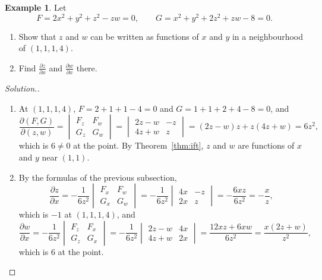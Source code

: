 \documentclass[11pt,a4paper]{article}
\theoremstyle{definition}
\newtheorem{exa}[thm]{Example}
\newenvironment{solution}
  {\renewcommand{\qedsymbol}{}\begin{proof}[\textit{Solution}.]}
  {\end{proof}}
\begin{document}
\begin{exa}
\label{ex:ift2}
Let
\[F = 2x^2 + y^2 + z^2 -zw = 0,\qquad G = x^2 + y^2 +2z^2 + zw- 8 = 0 .\]
\begin{enumerate}
\item Show that $z$ and $w$ can be written as functions of $x$ and $y$ in a
neighbourhood of $(1,1,1,4)$.

\item Find $\frac{\partial z}{\partial x}$ and $\frac{\partial w}{\partial x}$
there.
\end{enumerate}
\end{exa}

\begin{solution}
\begin{enumerate}
\item At $(1,1,1,4)$, $F = 2 + 1 + 1 - 4 = 0$ and $G = 1 + 1 + 2 + 4 - 8 = 0$, and
\[\frac{\partial (F,G)}{\partial (z,w)} = \begin{vmatrix}
F_z & F_w\\
G_z & G_w
\end{vmatrix}=\begin{vmatrix}
2z - w & -z\\
4z + w & z
\end{vmatrix} = (2z - w)z + z(4z + w) = 6z^2 ,\]
which is $6\neq 0$ at the point. By Theorem~\ref{thm:ift}, $z$ and $w$ are
functions of $x$ and $y$ near $(1,1)$.

\item By the formulas of the previous subsection,
\[\frac{\partial z}{\partial x} = -\frac{1}{6z^2}\begin{vmatrix}
F_x & F_w\\
G_x & G_w
\end{vmatrix} = -\frac{1}{6z^2}\begin{vmatrix}
4x & -z\\
2x & z
\end{vmatrix} = -\frac{6xz}{6z^2} = -\frac{x}{z},\]
which is $-1$ at $(1,1,1,4)$, and
\[\frac{\partial w}{\partial x} = -\frac{1}{6z^2}\begin{vmatrix}
F_z & F_x\\
G_z & G_x
\end{vmatrix} = -\frac{1}{6z^2}\begin{vmatrix}
2z-w & 4x\\
4z + w & 2x
\end{vmatrix} = \frac{12xz + 6xw}{6z^2} = \frac{x(2z + w)}{z^2},\]
which is $6$ at the point.
\end{enumerate}
\end{solution}
\end{document}
